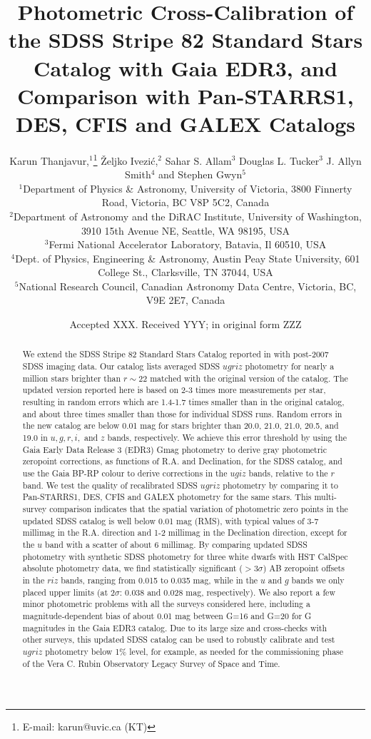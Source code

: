 \documentclass[fleqn,usenatbib]{mnras}
\title[SDSS Stripe 82 Standard Stars Catalog: New and Improved]{Photometric Cross-Calibration
of the SDSS Stripe 82 Standard Stars Catalog with Gaia EDR3, and Comparison with Pan-STARRS1, DES, 
CFIS and GALEX Catalogs}
\author[K. Thanjavur et al.]{
Karun Thanjavur,$^{1}$\thanks{E-mail: karun@uvic.ca (KT)}
\v{Z}eljko Ivezi\'{c},$^{2}$
Sahar S. Allam$^{3}$
Douglas L. Tucker$^{3}$
J. Allyn Smith$^{4}$
and Stephen Gwyn$^{5}$
\\
$^{1}$Department of Physics \& Astronomy, University of Victoria, 3800 Finnerty Road, Victoria, BC V8P 5C2, Canada\\
$^{2}$Department of Astronomy and the DiRAC Institute, University of Washington, 3910 15th Avenue NE, Seattle, WA 98195, USA\\
$^{3}$Fermi National Accelerator Laboratory, Batavia, Il 60510, USA\\
$^{4}$Dept. of Physics, Engineering \& Astronomy, Austin Peay State University, 601 College St., Clarksville, TN 37044, USA\\
$^{5}$National Research Council, Canadian Astronomy Data Centre, Victoria, BC, V9E 2E7, Canada
}
\date{Accepted XXX. Received YYY; in original form ZZZ}
\begin{document}
\label{firstpage}
\pagerange{\pageref{firstpage}--\pageref{lastpage}}
\maketitle

\begin{abstract}
We extend the SDSS Stripe 82 Standard Stars Catalog reported in \citet{Ivez07} with
post-2007 SDSS imaging data. Our catalog lists averaged SDSS $ugriz$ photometry
for nearly a million stars brighter than $r\sim22$ matched with the original version of the catalog. 
The updated version reported here is based on 2-3 times more measurements per star, resulting 
in random errors which are 1.4-1.7 times smaller than in the original catalog, and about three 
times smaller than those for individual SDSS runs. Random errors in the new catalog are below 
0.01 mag for stars brighter than 20.0, 21.0, 21.0, 20.5, and 19.0 in $u,g,r,i,$ and $z$ bands, respectively. 
We achieve this error threshold by using the Gaia Early Data Release 3 (EDR3) Gmag photometry to derive gray photometric 
zeropoint corrections, as functions of R.A. and Declination, for the SDSS catalog, and use the Gaia 
BP-RP colour to derive corrections in the $ugiz$ bands, relative to the $r$ band. We test the 
quality of recalibrated SDSS $ugriz$ photometry by comparing it to Pan-STARRS1, DES, CFIS 
and GALEX photometry for the same stars. This multi-survey 
comparison indicates that the spatial variation of photometric zero points in the updated SDSS 
catalog is well below 0.01 mag (RMS), with typical values of 3-7 millimag in the R.A. direction and 
1-2 millimag in the Declination direction, except for the $u$ band with a scatter of about 6 millimag.
By comparing updated SDSS photometry with synthetic SDSS photometry for three white dwarfs
with HST CalSpec absolute photometry data, we find statistically significant ($>3\sigma$) 
AB zeropoint offsets in the $riz$ bands, ranging from 0.015 to 0.035 mag, while in the $u$ 
and $g$ bands we only placed upper limits (at $2\sigma$: 0.038 and 0.028 mag, respectively).  
We also report a few minor photometric problems with all the surveys considered here, including 
a magnitude-dependent bias of about 0.01 mag between G=16 and G=20 for G magnitudes in the Gaia EDR3 
 catalog. Due to its large size and cross-checks with other surveys, this updated 
SDSS catalog can be used to robustly calibrate and test $ugriz$ photometry below 1\% level, for example, 
as needed for the commissioning phase of the Vera C. Rubin Observatory Legacy Survey of Space and Time. 
\end{abstract}
\end{document}
